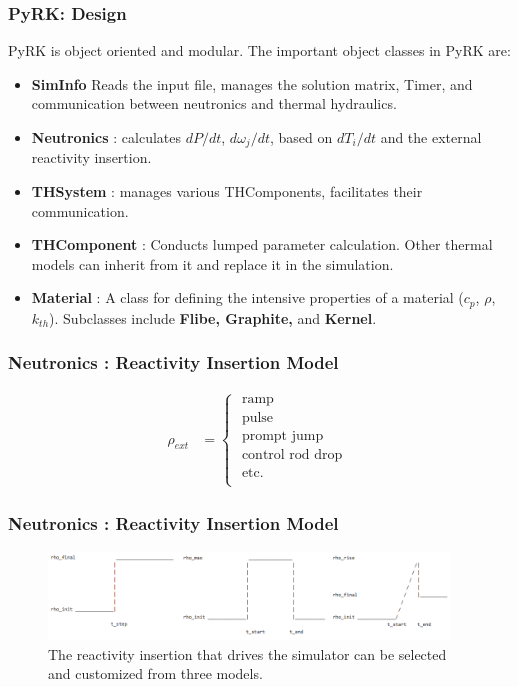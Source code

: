\begin{frame}[fragile]
\frametitle{PyRK: Design}
\footnotesize{
PyRK is object oriented and modular. The important object classes in PyRK are:
\begin{itemize}
\item \textbf{SimInfo} Reads the input file, manages the solution matrix, Timer, and communication between neutronics and thermal hydraulics.
\item \textbf{Neutronics} : calculates $dP/dt$, $d\omega_j/dt$, based on 
$dT_i/dt$ and the external reactivity insertion.
\item \textbf{THSystem} : manages various THComponents, facilitates their 
communication.
\item \textbf{THComponent} : Conducts lumped parameter calculation. Other 
thermal models can inherit from it and replace it in the simulation.
\item \textbf{Material} : A class for defining the intensive properties of a 
material ($c_p$, $\rho$, $k_{th}$). Subclasses include \textbf{Flibe, 
Graphite,} and \textbf{Kernel}.
\end{itemize}
}
\end{frame}
\begin{frame}[fragile]
  \frametitle{Neutronics : Reactivity Insertion Model}
  \begin{align}
    \rho_{ext} &= \left\{
                  \begin{array}{l}
                            \mbox{ ramp } \\
                            \mbox{ pulse } \\
                            \mbox{ prompt jump }\\
                            \mbox{ control rod drop }\\
                            \mbox{ etc. } \\
                  \end{array}
                  \right.
  \end{align}
\end{frame}

\begin{frame}[fragile]
  \frametitle{Neutronics : Reactivity Insertion Model}
  \begin{figure}[htbp!]
    \begin{center}
      \includegraphics[width=0.95\textwidth]{./progress/ri.png}
    \end{center}
    \caption{The reactivity insertion that drives the simulator can be selected 
    and customized from three models.  }
    \label{fig:ri}
  \end{figure}
  
\end{frame}

